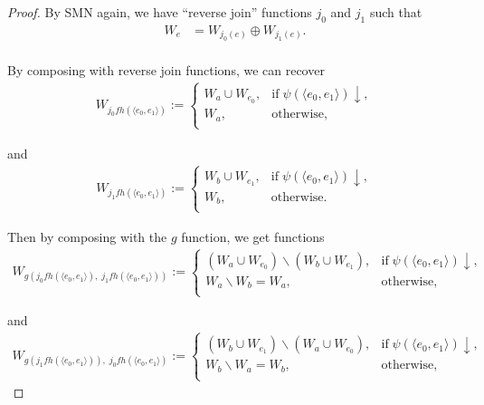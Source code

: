 \documentclass{article}
\begin{document}
\begin{enumerate}[label={\bf Q\arabic*:}]
\begin{enumerate}[label={(\roman*)}]
\begin{proof}
          By SMN again, we have ``reverse join'' functions $j_0$ and $j_1$
          such that
          \begin{align*}
            W_e &=W_{j_0(e)} \oplus W_{j_1(e)}.\\
          \end{align*}

          By composing with reverse join functions, we can recover
          \begin{align*}
            W_{j_0fh(\langle e_0,e_1\rangle)} :=
            \begin{cases}
              W_a\cup W_{e_0}, &\text{if}\; \psi(\langle
                e_0,e_1\rangle)\downarrow,\\
              W_a, &\text{otherwise},\\
            \end{cases}
          \end{align*}

          and
          \begin{align*}
            W_{j_1fh(\langle e_0,e_1\rangle)} :=
            \begin{cases}
              W_b\cup W_{e_1}, &\text{if}\; \psi(\langle
                e_0,e_1\rangle)\downarrow,\\
              W_b, &\text{otherwise}.\\
            \end{cases}
          \end{align*}

          Then by composing with the $g$ function, we get functions
          \begin{align*}
            W_{g(j_0fh(\langle e_0,e_1\rangle),\; j_1fh(\langle
            e_0,e_1\rangle))} :=
            \begin{cases}
              (W_a\cup W_{e_0})\backslash(W_b\cup W_{e_1}), &\text{if}\;
                \psi(\langle e_0,e_1\rangle)\downarrow,\\
              W_a\backslash W_b=W_a, &\text{otherwise},\\
            \end{cases}
          \end{align*}

          and
          \begin{align*}
            W_{g(j_1fh(\langle e_0,e_1\rangle)),\; j_0fh(\langle
            e_0,e_1\rangle)} :=
            \begin{cases}
              (W_b\cup W_{e_1})\backslash(W_a\cup W_{e_0}), &\text{if}\;
                \psi(\langle e_0,e_1\rangle)\downarrow,\\
              W_b\backslash W_a=W_b, &\text{otherwise},\\
            \end{cases}
          \end{align*}


\end{proof}
\end{enumerate}
\end{enumerate}
\end{document}
